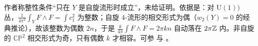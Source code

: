 \begin{yizhu}[含糊点]
作者称整性条件“只在 $Y$ 是自旋流形时成立”，未给证明。依据是：对 $\mathrm{U}(1))$ 丛，$\frac{1}{4\pi^2}\int_Y F\wedge F = \int c_1^2$ 为整数；自旋 4-流形的相交形式为偶（$w_2(Y)=0$ 的经典推论），故该整数为偶数 $2n$，于是 $\frac{k}{4\pi}\int F\wedge F = 2\pi kn$ 自动落在 $2\pi\mathbb{Z}$ 内。非自旋的 $\mathbb{CP}^2$ 相交形式为奇，只有偶数 $k$ 才相容。可参 \cite{witten1989} 与 \cite{aps1975}。
\end{yizhu}

